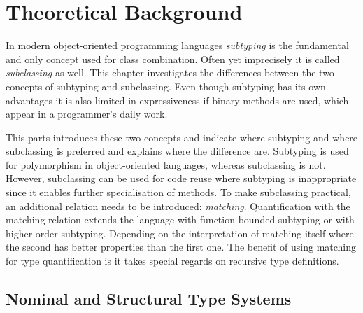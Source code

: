 \chapter{Theoretical Background}
\label{ctr:theoreticalBackground}
In modern object-oriented programming languages \emph{subtyping}
is the fundamental and only concept used for class
combination.  Often yet
imprecisely it is called \emph{subclassing} as well. This chapter
investigates the differences between the two concepts of subtyping and
subclassing. Even though subtyping has its own advantages it is also
limited in expressiveness if binary methods are used, which appear in
a programmer's daily work.

This parts introduces these two concepts and indicate where subtyping
and where subclassing is preferred and explains where the difference are.
Subtyping is used for polymorphism in object-oriented languages, whereas
subclassing is not. However, subclassing can be used for code reuse
where subtyping is inappropriate since it enables further specialisation
of methods.  To make subclassing practical, an additional relation needs
to be introduced: \emph{matching}. Quantification with the matching
relation extends the language with function-bounded subtyping or with
higher-order subtyping. Depending on the interpretation of matching
itself where the second has better properties than the first one. The
benefit of using matching for type quantification is it takes special
regards on recursive type definitions.

\section{Nominal and Structural Type Systems}


